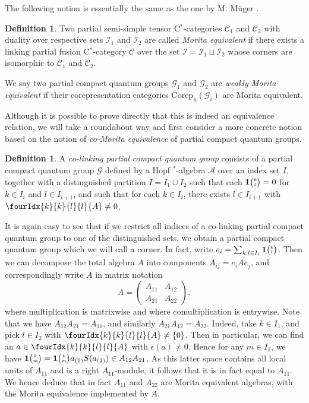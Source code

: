 \documentclass[10pt]{article}
\newcommand{\Corep}{\mathrm{Corep}}
\newcommand{\CatCC}{\mathscr{C}}
\newcommand{\Grt}[3]{#1{\tiny {\begin{pmatrix} #2\\#3\end{pmatrix}}}}
\newcommand{\UnitC}[2]{\Grt{\mathbf{1}}{#1}{#2}}
\newcommand{\Gr}[5]{\fourIdx{#2}{#4}{#3}{#5}{#1}}%
\theoremstyle{definition}
\newtheorem{Def}[Theorem]{Definition}
\numberwithin{equation}{section}
\begin{document}
The following notion is essentially the same as the one by M. M\"{u}ger \cite{Mug1}. 

\begin{Def} Two partial semi-simple tensor C$^*$-categories $\CatCC_1$ and $\CatCC_2$ with duality over respective sets $\mathscr{I}_1$ and $\mathscr{I}_2$ are called \emph{Morita equivalent} if there exists a linking partial fusion C$^*$-category $\CatCC$ over the set $\mathscr{I}=\mathscr{I}_1\sqcup \mathscr{I}_2$ whose corners are isomorphic to $\CatCC_1$ and $\CatCC_2$.

We say two partial compact quantum groups $\mathscr{G}_1$ and $\mathscr{G}_2$ are \emph{weakly Morita equivalent} if their corepresentation categories $\Corep_u(\mathscr{G}_i)$ are Morita equivalent. 
\end{Def} 

Although it is possible to prove directly that this is indeed an equivalence relation, we will take a roundabout way and first consider a more concrete notion based on the notion of \emph{co-Morita equivalence} of partial compact quantum groups.

\begin{Def}\label{DefCoLink} A \emph{co-linking partial compact quantum group} consists of a partial compact quantum group $\mathscr{G}$ defined by a Hopf $^*$-algebra $\mathscr{A}$ over an index set $I$, together with a distinguished partition $I = I_1\cup I_2$ such that each $\UnitC{k}{l}=0$ for $k\in I_i$ and $l\in I_{i+1}$, and such that for each $k\in I_i$, there exists $l\in I_{i+1}$ with $\Gr{A}{k}{l}{k}{l}\neq 0$.  
\end{Def} 

It is again easy to see that if we restrict all indices of a co-linking partial compact quantum group to one of the distinguished sets, we obtain a partial compact quantum group which we will call a corner. In fact, write $e_i = \sum_{k,l\in I_i} \UnitC{k}{l}$. Then we can decompose the total algebra $A$ into components $A_{ij} = e_{i}Ae_{j}$, and correspondingly write $A$ in matrix notation \[ A = \begin{pmatrix} A_{11} & A_{12}  \\ A_{21} & A_{22}\end{pmatrix},\] where multiplication is matrixwise and where comultiplication is entrywise. Note that we have $A_{12}A_{21} = A_{11}$, and similarly $A_{21}A_{12} = A_{22}$. Indeed, take $k\in I_1$, and pick $l\in I_2$ with $\Gr{A}{k}{l}{k}{l}\neq \{0\}$. Then in particular, we can find an $a\in \Gr{A}{k}{l}{k}{l}$ with $\epsilon(a)\neq 0$. Hence for any $m\in I_1$, we have $\UnitC{k}{m} = \UnitC{k}{m} a_{(1)}S(a_{(2)}) \in A_{12}A_{21}$. As this latter space contains all local units of $A_{11}$ and is a right $A_{11}$-module, it follows that it is in fact equal to $A_{11}$. We hence deduce that in fact $A_{11}$ and $A_{22}$ are Morita equivalent algebras, with the Morita equivalence implemented by $A$. %
\end{document}
